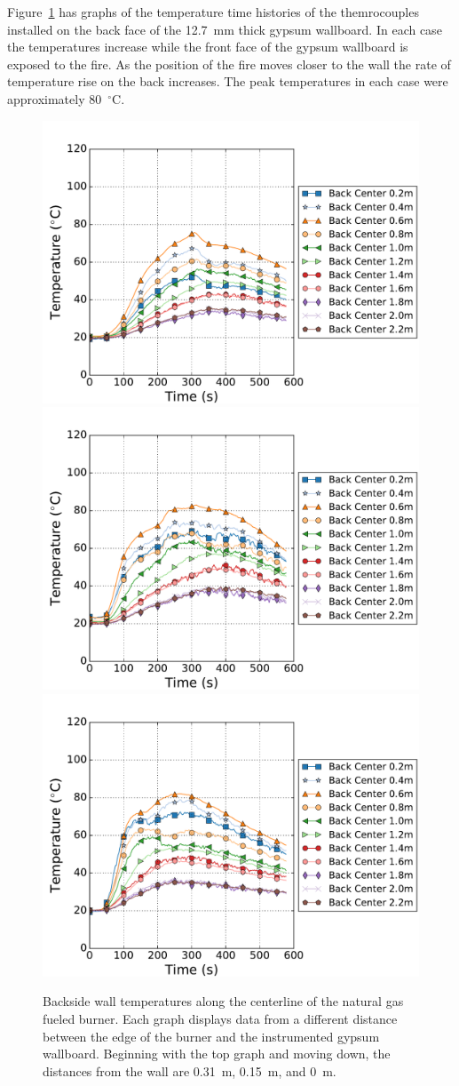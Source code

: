 \documentclass[twoside]{uocthesis}
\begin{document}
Figure~\ref{IWGB_NG_TC_Backside_set} has graphs of the temperature time histories of the themrocouples installed on the back face of the 12.7~mm thick gypsum wallboard.  In each case the temperatures increase while the front face of the gypsum wallboard is exposed to the fire.  As the position of the fire moves closer to the wall the rate of temperature rise on the back increases.  The peak temperatures in each case were approximately 80~$^\circ$C.   

\begin{figure}[ht!]
	\centering
	\includegraphics[width=.625\columnwidth]{../Figures/IWGBNG01_TC_Back_Center_Avg}\\
	\includegraphics[width=.625\columnwidth]{../Figures/IWGBNG04_TC_Back_Center_Avg}\\
	\includegraphics[width=.625\columnwidth]{../Figures/IWGBNG05_TC_Back_Center_Avg}\\
	\caption[Backside wall temperatures for the natural gas fueled burner]{Backside wall temperatures along the centerline of the natural gas fueled burner. Each graph displays data from a different distance between the edge of the burner and the instrumented gypsum wallboard.  Beginning with the top graph and moving down, the distances from the wall are 0.31~m, 0.15~m, and 0~m.}
	\label{IWGB_NG_TC_Backside_set}
\end{figure}
\end{document}

